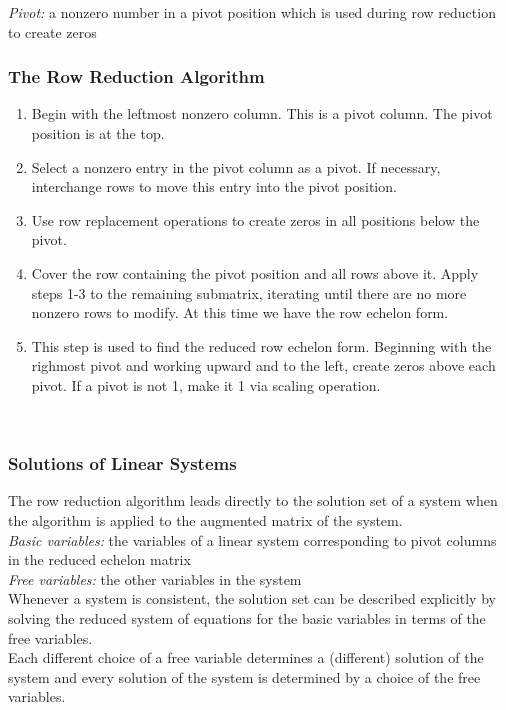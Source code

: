 \documentclass[12pt]{article} %
\begin{document}
\emph{Pivot:} a nonzero number in a pivot position which is used during row reduction to create zeros\\

\subsubsection{The Row Reduction Algorithm}
\begin{enumerate}
	\item Begin with the leftmost nonzero column. This is a pivot column. The pivot position is at the top.
	\item Select a nonzero entry in the pivot column as a pivot. If necessary, interchange rows to move this entry into the pivot position. 
	\item Use row replacement operations to create zeros in all positions below the pivot.
	\item Cover the row containing the pivot position and all rows above it. Apply steps 1-3 to the remaining submatrix, iterating until there are no more nonzero rows to modify. At this time we have the row echelon form.
	\item This step is used to find the reduced row echelon form. Beginning with the righmost pivot and working upward and to the left, create zeros above each pivot. If a pivot is not 1, make it 1 via scaling operation.
\end{enumerate}
\leavevmode \\
\subsubsection{Solutions of Linear Systems}
The row reduction algorithm leads directly to the solution set of a system when the algorithm is applied to the augmented matrix of the system.\\

\emph{Basic variables:} the variables of a linear system corresponding to pivot columns in the reduced echelon matrix \\

\emph{Free variables:} the other variables in the system\\

Whenever a system is consistent, the solution set can be described explicitly by solving the reduced system of equations for the basic variables in terms of the free variables.\\
Each different choice of a free variable determines a (different) solution of the system and every solution of the system is determined by a choice of the free variables.
\end{document}
